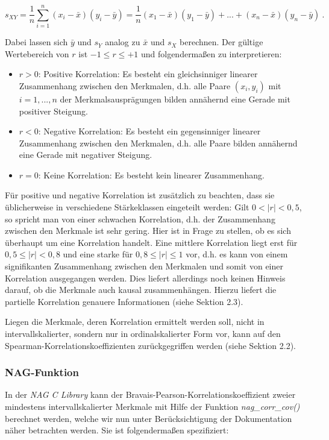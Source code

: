 \begin{equation*}
	s_{XY}=\dfrac{1}{n}\sum_{i=1}^{n}{(x_i-\bar{x})(y_i-\bar{y})}=\dfrac{1}{n}(x_1-\bar{x})(y_1-\bar{y})+...+(x_n-\bar{x})(y_n-\bar{y}) ~.
\end{equation*}

\noindent Dabei lassen sich $\bar{y}$ und $s_{Y}$ analog zu $\bar{x}$ und $s_{X}$ berechnen. Der gültige Wertebereich von $r$ ist $-1 \leq r \leq +1$ und folgendermaßen zu interpretieren:
\begin{itemize}
    \item $r>0$: Positive Korrelation: Es besteht ein gleichsinniger linearer Zusammenhang zwischen den Merkmalen, d.h. alle Paare $(x_i, y_i)$ mit $i=1,...,n$ der Merkmalsausprägungen bilden annähernd eine Gerade mit positiver Steigung.
    \item $r<0$: Negative Korrelation: Es besteht ein gegensinniger linearer Zusammenhang zwischen den Merkmalen, d.h. alle Paare bilden annähernd eine Gerade mit negativer Steigung.
    \item $r=0$: Keine Korrelation: Es besteht kein linearer Zusammenhang.
\end{itemize}

\noindent Für positive und negative Korrelation ist zusätzlich zu beachten, dass sie üblicherweise in verschiedene Stärkeklassen eingeteilt werden: Gilt $0<|r|<0,5$, so spricht man von einer schwachen Korrelation, d.h. der Zusammenhang zwischen den Merkmale ist sehr gering. Hier ist in Frage zu stellen, ob es sich überhaupt um eine Korrelation handelt. Eine mittlere Korrelation liegt erst für $0,5 \leq |r| < 0,8$ und eine starke für $0,8 \leq |r| \leq 1$ vor, d.h. es kann von einem signifikanten Zusammenhang zwischen den Merkmalen und somit von einer Korrelation ausgegangen werden. Dies liefert allerdings noch keinen Hinweis darauf, ob die Merkmale auch kausal zusammenhängen. Hierzu liefert die partielle Korrelation genauere Informationen (siehe Sektion 2.3).

Liegen die Merkmale, deren Korrelation ermittelt werden soll, nicht in intervallskalierter, sondern nur in ordinalskalierter Form vor, kann auf den Spearman-Korrelationskoeffizienten zurückgegriffen werden (siehe Sektion 2.2).

\subsubsection{NAG-Funktion}

In der {\it NAG C Library} kann der Bravais-Pearson-Korrelationskoeffizient zweier mindestens intervallskalierter Merkmale mit Hilfe der Funktion {\it nag\_corr\_cov()} berechnet werden, welche wir nun unter Berücksichtigung der Dokumentation \cite{nag:g02bxc} näher betrachten werden. Sie ist folgendermaßen spezifiziert:\\

